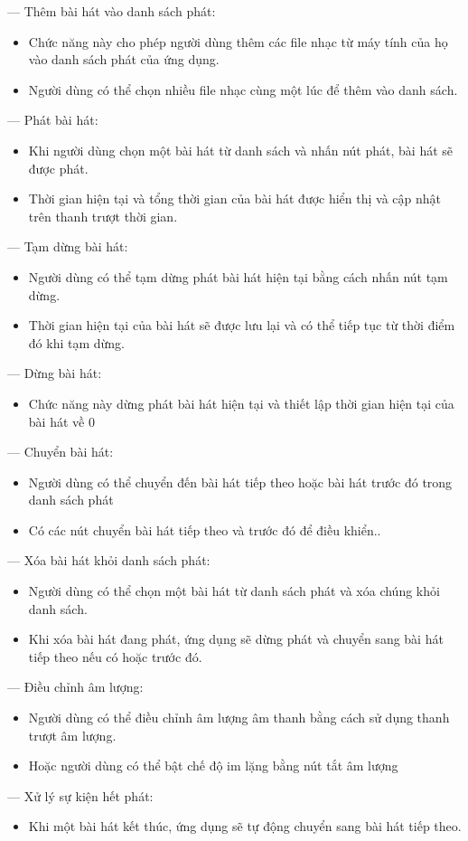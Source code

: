 \documentclass[a4paper]{article}
\begin{document}
\noindent --- Thêm bài hát vào danh sách phát:
    \begin{itemize}
        \item Chức năng này cho phép người dùng thêm các file nhạc từ máy tính của họ vào danh sách phát của ứng dụng.
        \item Người dùng có thể chọn nhiều file nhạc cùng một lúc để thêm vào danh sách.
    \end{itemize}
\noindent ---  Phát bài hát:
    \begin{itemize}
        \item Khi người dùng chọn một bài hát từ danh sách và nhấn nút phát, bài hát sẽ được phát.
        \item Thời gian hiện tại và tổng thời gian của bài hát được hiển thị và cập nhật trên thanh trượt thời gian.
    \end{itemize}
\noindent --- Tạm dừng bài hát:
    \begin{itemize}
        \item Người dùng có thể tạm dừng phát bài hát hiện tại bằng cách nhấn nút tạm dừng.
        \item Thời gian hiện tại của bài hát sẽ được lưu lại và có thể tiếp tục từ thời điểm đó khi tạm dừng.
    \end{itemize}
\noindent --- Dừng bài hát:
    \begin{itemize}
        \item Chức năng này dừng phát bài hát hiện tại và thiết lập thời gian hiện tại của bài hát về 0
    \end{itemize}
\noindent --- Chuyển bài hát:
    \begin{itemize}
        \item Người dùng có thể chuyển đến bài hát tiếp theo hoặc bài hát trước đó trong danh sách phát
        \item Có các nút chuyển bài hát tiếp theo và trước đó để điều khiển..
    \end{itemize}
\noindent --- Xóa bài hát khỏi danh sách phát:
    \begin{itemize}
        \item Người dùng có thể chọn một bài hát từ danh sách phát và xóa chúng khỏi danh sách.
        \item Khi xóa bài hát đang phát, ứng dụng sẽ dừng phát và chuyển sang bài hát tiếp theo nếu có hoặc trước đó.
    \end{itemize}
\noindent --- Điều chỉnh âm lượng:
    \begin{itemize}
        \item Người dùng có thể điều chỉnh âm lượng âm thanh bằng cách sử dụng thanh trượt âm lượng.
        \item Hoặc người dùng có thể bật chế độ im lặng bằng nút tắt âm lượng
    \end{itemize}
\noindent --- Xử lý sự kiện hết phát:
    \begin{itemize}
        \item Khi một bài hát kết thúc, ứng dụng sẽ tự động chuyển sang bài hát tiếp theo.
    \end{itemize}
\end{document}
